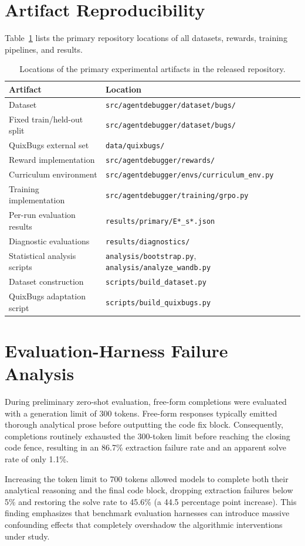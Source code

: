 \documentclass{article}
\begin{document}
\section{Artifact Reproducibility}
\label{app:artifact}

Table~\ref{tab:artifacts} lists the primary repository locations of all datasets, rewards, training pipelines, and results.

\begin{table}[h]
\centering
\small
\begin{tabular}{ll}
\toprule
\textbf{Artifact} & \textbf{Location} \\
\midrule
Dataset & \texttt{src/agentdebugger/dataset/bugs/} \\
Fixed train/held-out split & \texttt{src/agentdebugger/dataset/bugs/} \\
QuixBugs external set & \texttt{data/quixbugs/} \\
Reward implementation & \texttt{src/agentdebugger/rewards/} \\
Curriculum environment & \texttt{src/agentdebugger/envs/curriculum\_env.py} \\
Training implementation & \texttt{src/agentdebugger/training/grpo.py} \\
Per-run evaluation results & \texttt{results/primary/E*\_s*.json} \\
Diagnostic evaluations & \texttt{results/diagnostics/} \\
Statistical analysis scripts & \texttt{analysis/bootstrap.py}, \texttt{analysis/analyze\_wandb.py} \\
Dataset construction & \texttt{scripts/build\_dataset.py} \\
QuixBugs adaptation script & \texttt{scripts/build\_quixbugs.py} \\
\bottomrule
\end{tabular}
\caption{Locations of the primary experimental artifacts in the released repository.}
\label{tab:artifacts}
\end{table}

\section{Evaluation-Harness Failure Analysis}
\label{app:harness}

During preliminary zero-shot evaluation, free-form completions were evaluated with a generation limit of 300 tokens. Free-form responses typically emitted thorough analytical prose before outputting the code fix block. Consequently, completions routinely exhausted the 300-token limit before reaching the closing code fence, resulting in an 86.7\% extraction failure rate and an apparent solve rate of only 1.1\%. 

Increasing the token limit to 700 tokens allowed models to complete both their analytical reasoning and the final code block, dropping extraction failures below 5\% and restoring the solve rate to 45.6\% (a 44.5 percentage point increase). This finding emphasizes that benchmark evaluation harnesses can introduce massive confounding effects that completely overshadow the algorithmic interventions under study.
\end{document}

